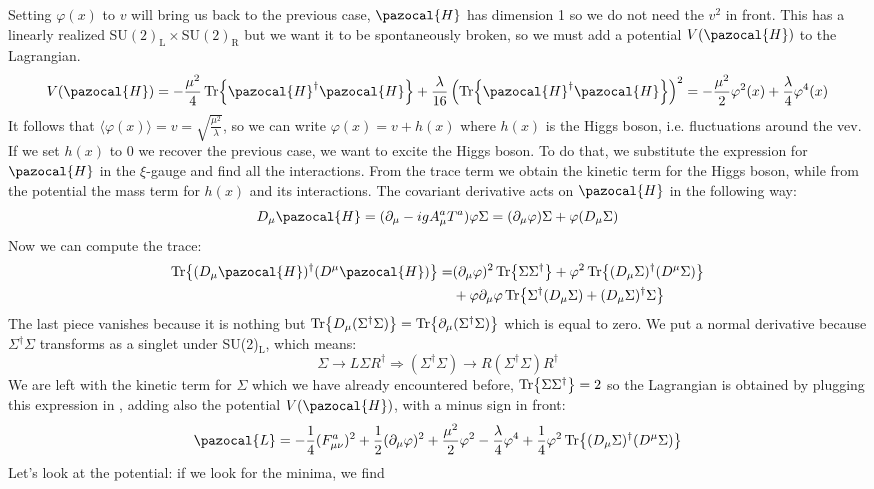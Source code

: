\documentclass[../main.tex]{subfiles}
\begin{document}
Setting $\varphi(x)$ to $v$ will bring us back to the previous case, $\pazocal{H}$ has dimension 1 so we do not need the $v^2$ in front. This has a linearly realized SU$(2)_{\text{L}}\times$SU$(2)_{\text{R}}$ but we want it to be spontaneously broken, so we must add a potential $V(\pazocal{H})$ to the Lagrangian.
\[
V(\pazocal{H})=-\frac{\mu^2}{4}\Tr{\pazocal{H}^\dagger\pazocal{H}}+\frac{\lambda}{16}\left(\Tr{\pazocal{H}^\dagger\pazocal{H}}\right)^2=-\frac{\mu^2}{2}\varphi^2(x)+\frac{\lambda}{4}\varphi^4(x)
\]
It follows that $\langle\varphi(x)\rangle=v=\sqrt{\frac{\mu^2}{\lambda}}$, so we can write $\varphi(x)=v+h(x)$ where $h(x)$ is the Higgs boson, i.e. fluctuations around the vev. If we set $h(x)$ to 0 we recover the previous case, we want to excite the Higgs boson. To do that, we substitute the expression for $\pazocal{H}$ in the $\xi$-gauge and find all the interactions. From the trace term we obtain the kinetic term for the Higgs boson, while from the potential the mass term for $h(x)$ and its interactions. The covariant derivative acts on $\pazocal{H}$ in the following way:
\[
D_\mu\pazocal{H}=(\partial_\mu-igA_\mu^aT^a)\varphi\Sigma=(\partial_\mu\varphi)\Sigma+\varphi(D_\mu\Sigma)
\]
Now we can compute the trace:
\begin{align*}
\Tr{(D_\mu\pazocal{H})^\dagger(D^\mu\pazocal{H})}=&(\partial_\mu\varphi)^2\Tr{\Sigma\Sigma^\dagger}+\varphi^2\Tr{(D_\mu\Sigma)^\dagger(D^\mu\Sigma)}\\
&+\varphi\partial_\mu\varphi\Tr{\Sigma^\dagger(D_\mu\Sigma)+(D_\mu\Sigma)^\dagger\Sigma}
\end{align*}
The last piece vanishes because it is nothing but $\Tr{D_\mu(\Sigma^\dagger\Sigma)}=\Tr{\partial_\mu(\Sigma^\dagger\Sigma)}$ which is equal to zero. We put a normal derivative because $\Sigma^\dagger\Sigma$ transforms as a singlet under SU(2)$_{\text{L}}$, which means:
\[
\Sigma\to L\Sigma R^\dagger\Rightarrow(\Sigma^\dagger\Sigma)\to R(\Sigma^\dagger\Sigma)R^\dagger
\]
We are left with the kinetic term for $\Sigma$ which we have already encountered before, $\Tr{\Sigma\Sigma^\dagger}=2$ so the Lagrangian is obtained by plugging this expression in , adding also the potential $V(\pazocal{H})$, with a minus sign in front:
\[
\pazocal{L}=-\frac{1}{4}(F_{\mu\nu}^a)^2+\frac{1}{2}(\partial_\mu\varphi)^2+\frac{\mu^2}{2}\varphi^2-\frac{\lambda}{4}\varphi^4+\frac{1}{4}\varphi^2\Tr{(D_\mu\Sigma)^\dagger(D^\mu\Sigma)}
\]
Let's look at the potential: if we look for the minima, we find\\
\end{document}
